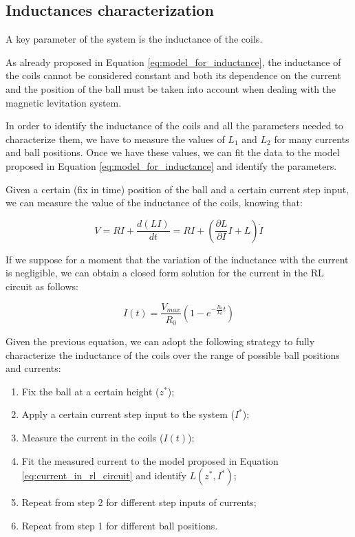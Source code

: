 \subsection{Inductances characterization}
\label{subsec:inductances_characterization}

A key parameter of the system is the inductance of the coils.

As already proposed in Equation \ref{eq:model_for_inductance}, the inductance of the coils cannot be considered constant and both its dependence on the current and the position of the ball must be taken into account when dealing with the magnetic levitation system.

In order to identify the inductance of the coils and all the parameters needed to characterize them, we have to measure the values of $L_1$ and $L_2$ for many currents and ball positions.
Once we have these values, we can fit the data to the model proposed in Equation \ref{eq:model_for_inductance} and identify the parameters.

Given a certain (fix in time) position of the ball and a certain current step input, we can measure the value of the inductance of the coils, knowing that:

\begin{equation}
    V = R I + \frac{d (L I)}{d t} = R I + \left( \frac{\partial L}{\partial I} I + L \right) \dot{I}
\end{equation}

If we suppose for a moment that the variation of the inductance with the current is negligible, we can obtain a closed form solution for the current in the RL circuit as follows:

\begin{equation}
    I(t) = \frac{V_{max}}{R_0} \left( 1 - e^{- \frac{R_0}{L_0} t} \right)
    \label{eq:current_in_rl_circuit}
\end{equation}

Given the previous equation, we can adopt the following strategy to fully characterize the inductance of the coils over the range of possible ball positions and currents:

\begin{enumerate}
    \item Fix the ball at a certain height ($z^*$);
    \item Apply a certain current step input to the system ($I^*$);
    \item Measure the current in the coils ($I(t)$);
    \item Fit the measured current to the model proposed in Equation \ref{eq:current_in_rl_circuit} and identify $L(z^*, I^*)$;
    \item Repeat from step 2 for different step inputs of currents;
    \item Repeat from step 1 for different ball positions.
\end{enumerate}

